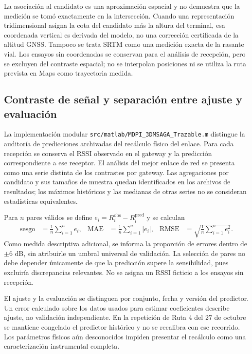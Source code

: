 La asociación al candidato es una aproximación espacial y no demuestra que la medición se tomó exactamente en la intersección. Cuando una representación tridimensional asigna la cota del candidato más la altura del terminal, esa coordenada vertical es derivada del modelo, no una corrección certificada de la altitud GNSS. Tampoco se trata SRTM como una medición exacta de la rasante vial. Los ensayos sin coordenadas se conservan para el análisis de recepción, pero se excluyen del contraste espacial; no se interpolan posiciones ni se utiliza la ruta prevista en Maps como trayectoria medida.

\subsection{Contraste de señal y separación entre ajuste y evaluación}

La implementación modular \nolinkurl{src/matlab/MDPI_3DMSAGA_Trazable.m} distingue la auditoría de predicciones archivadas del recálculo físico del enlace. Para cada recepción se conserva el RSSI observado en el gateway y la predicción correspondiente a ese receptor. El análisis del mejor enlace de red se presenta como una serie distinta de los contrastes por gateway. Las agregaciones por candidato y sus tamaños de muestra quedan identificados en los archivos de resultados; los máximos históricos y las medianas de otras series no se consideran estadísticas equivalentes.

Para $n$ pares válidos se define $e_i=R_i^{\mathrm{obs}}-R_i^{\mathrm{pred}}$ y se calculan
\begin{align}
 \mathrm{sesgo}&=\frac{1}{n}\sum_{i=1}^n e_i,&
 \mathrm{MAE}&=\frac{1}{n}\sum_{i=1}^n |e_i|,&
 \mathrm{RMSE}&=\sqrt{\frac{1}{n}\sum_{i=1}^n e_i^2}.
\end{align}
Como medida descriptiva adicional, se informa la proporción de errores dentro de $\pm6$ dB, sin atribuirle un umbral universal de validación. La selección de pares no debe depender únicamente de que la predicción supere la sensibilidad, pues excluiría discrepancias relevantes. No se asigna un RSSI ficticio a los ensayos sin recepción.

El ajuste y la evaluación se distinguen por conjunto, fecha y versión del predictor. Un error calculado sobre los datos usados para estimar coeficientes describe ajuste, no validación independiente. En la repetición de Ruta 4 del 27 de octubre se mantiene congelado el predictor histórico y no se recalibra con ese recorrido. Los parámetros físicos aún desconocidos impiden presentar el recálculo como una caracterización instrumental completa.

